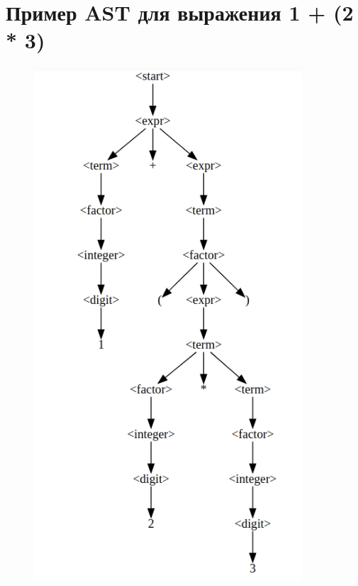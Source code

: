 \documentclass[a4paper]{article}
\begin{document}
\newpage
\section{Пример AST для выражения 1 + (2 * 3)}
\label{appendix:SimpleAST}
\begin{figure}[ht!]
    \includegraphics[width=100mm]{SimpleAST.png}
    \end{figure}
\end{document}
